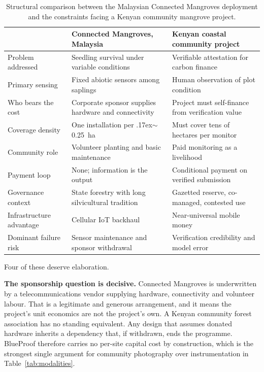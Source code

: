 \documentclass[10pt,twocolumn,a4paper]{article}
\begin{document}
\begin{table}[t]
\centering
\small
\caption{Structural comparison between the Malaysian Connected Mangroves
deployment and the constraints facing a Kenyan community mangrove project.}
\label{tab:malaysia}
\begin{tabular}{@{}p{3.1cm}p{6.2cm}p{6.2cm}@{}}
\toprule
& \textbf{Connected Mangroves, Malaysia} & \textbf{Kenyan coastal community project} \\
\midrule
Problem addressed & Seedling survival under variable conditions & Verifiable attestation for carbon finance \\
Primary sensing & Fixed abiotic sensors among saplings & Human observation of plot condition \\
Who bears the cost & Corporate sponsor supplies hardware and connectivity & Project must self-finance from verification value \\
Coverage density & One installation per {\raise.17ex\hbox{$\scriptstyle\sim$}}0.25~ha & Must cover tens of hectares per monitor \\
Community role & Volunteer planting and basic maintenance & Paid monitoring as a livelihood \\
Payment loop & None; information is the output & Conditional payment on verified submission \\
Governance context & State forestry with long silvicultural tradition & Gazetted reserve, co-managed, contested use \\
Infrastructure advantage & Cellular IoT backhaul & Near-universal mobile money \\
Dominant failure risk & Sensor maintenance and sponsor withdrawal & Verification credibility and model error \\
\bottomrule
\end{tabular}
\end{table}

Four of these deserve elaboration.

\textbf{The sponsorship question is decisive.} Connected Mangroves is
underwritten by a telecommunications vendor supplying hardware, connectivity and
volunteer labour. That is a legitimate and generous arrangement, and it means
the project's unit economics are not the project's own. A Kenyan community
forest association has no standing equivalent. Any design that assumes donated
hardware inherits a dependency that, if withdrawn, ends the programme. BlueProof
therefore carries no per-site capital cost by construction, which is the
strongest single argument for community photography over instrumentation in
Table~\ref{tab:modalities}.
\end{document}
